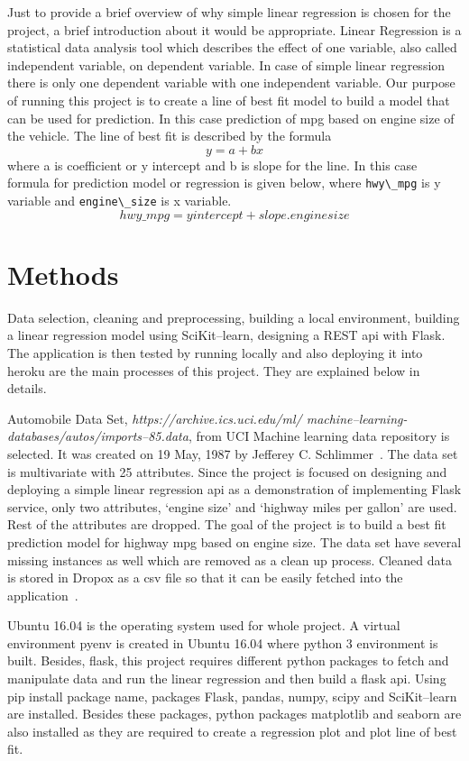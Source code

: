   Just to provide a brief overview of why simple linear regression is
  chosen for the project, a brief introduction about it would be
  appropriate. Linear Regression is a statistical data analysis tool
  which describes the effect of one variable, also called independent
  variable, on dependent variable. In case of simple linear regression
  there is only one dependent variable with one independent variable.
  Our purpose of running this project
  is to create a line of best fit model to build a model that can be used
  for prediction. In this case prediction of mpg based on engine size
  of the vehicle. The line of best fit is described by the
  formula \[y = a + bx\] where a is coefficient or y intercept and b is
  slope for the line. In this case formula for prediction model or
  regression is given below, where \verb|hwy\_mpg| is y variable and
  \verb|engine\_size| is x variable.
  \[hwy\_mpg = yintercept + slope.enginesize\] 

\section{Methods}
 
  Data selection, cleaning and preprocessing, building a local
  environment, building a linear regression model using SciKit--learn,
  designing a REST api with Flask. The application is then tested by running 
  locally and also deploying it into heroku are the main
  processes of this project. They are explained below in details. 

   Automobile Data Set, \textit{https://archive.ics.uci.edu/ml/
   machine--learning-databases/autos/imports--85.data}, from UCI
   Machine learning data repository is selected. It was created
   on 19 May, 1987 by Jefferey C. Schlimmer~\cite{hid-sp18-415-uci-com}. The
   data set is multivariate with 25 attributes. Since the project
   is focused on designing and deploying a simple linear
   regression api as a demonstration of implementing Flask service,
   only two attributes, `engine size' and `highway miles per gallon'
   are used. Rest of the attributes are dropped. The goal of the
   project is to build a best fit prediction model for highway mpg
   based on engine size. The data set have several missing instances
   as well which are removed as a clean up process. Cleaned data is stored in
   Dropox as a csv   file so that it can be easily fetched into the
   application~\cite{hid-sp18-415-data}.
  
 Ubuntu 16.04 is the operating system used for whole project.
 A virtual environment pyenv is created in Ubuntu 16.04 where python 3
 environment is built. Besides, flask, this project requires different python
 packages to fetch and manipulate data and run the linear regression and
 then build a flask api. Using pip install package name, packages Flask,
 pandas, numpy, scipy and SciKit--learn are installed. Besides these
 packages, python packages matplotlib and seaborn are also installed as they
 are required to create a regression plot and plot line of best fit. 
 
